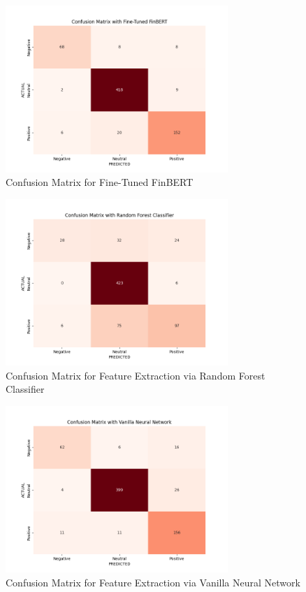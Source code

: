 \documentclass{article}
\begin{document}
\begin{figure}[!htbp]
    \centering
    \includegraphics[width=0.75\textwidth]{assets/conf_mat_finetuned.png}
    \caption{Confusion Matrix for Fine-Tuned FinBERT}
    \label{fig:finetuned}
\end{figure}

\newpage 

\begin{figure}
    \centering
    \includegraphics[width=0.75\textwidth]{assets/conf_mat_for_rfc.png}
    \caption{Confusion Matrix for Feature Extraction via Random Forest Classifier}
    \label{fig:rfc}
\end{figure}

\begin{figure}
    \centering
    \includegraphics[width=0.75\textwidth]{assets/conf_mat_for_nn.png}
    \caption{Confusion Matrix for Feature Extraction via Vanilla Neural Network}
    \label{fig:nn}
\end{figure}
\end{document}

